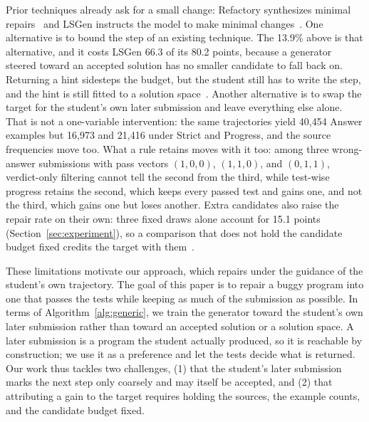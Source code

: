 \documentclass[10pt,conference]{IEEEtran}
\begin{document}
Prior techniques already ask for a small change: Refactory synthesizes minimal repairs~\cite{hu2019re} and LSGen instructs the model to make minimal changes~\cite{dai2026learner}. One alternative is to bound the step of an existing technique. The 13.9\% above is that alternative, and it costs LSGen 66.3 of its 80.2 points, because a generator steered toward an accepted solution has no smaller candidate to fall back on. Returning a hint sidesteps the budget, but the student still has to write the step, and the hint is still fitted to a solution space~\cite{rivers2017data,price2017isnap,roest2024next}. Another alternative is to swap the target for the student's own later submission and leave everything else alone. That is not a one-variable intervention: the same trajectories yield 40,454 Answer examples but 16,973 and 21,416 under Strict and Progress, and the source frequencies move too. What a rule retains moves with it too: among three wrong-answer submissions with pass vectors \((1,0,0)\), \((1,1,0)\), and \((0,1,1)\), verdict-only filtering cannot tell the second from the third, while test-wise progress retains the second, which keeps every passed test and gains one, and not the third, which gains one but loses another. Extra candidates also raise the repair rate on their own: three fixed draws alone account for 15.1 points (Section~\ref{sec:experiment}), so a comparison that does not hold the candidate budget fixed credits the target with them~\cite{zhang2024pydex,koutcheme2024benchmarking,yang2024cref,orvalho2025counterexample,dai2026learner}.

These limitations motivate our approach, which repairs under the guidance of the student's own trajectory. The goal of this paper is to repair a buggy program into one that passes the tests while keeping as much of the submission as possible. In terms of Algorithm~\ref{alg:generic}, we train the generator toward the student's own later submission rather than toward an accepted solution or a solution space. A later submission is a program the student actually produced, so it is reachable by construction; we use it as a preference and let the tests decide what is returned. Our work thus tackles two challenges, (1) that the student's later submission marks the next step only coarsely and may itself be accepted, and (2) that attributing a gain to the target requires holding the sources, the example counts, and the candidate budget fixed.
\end{document}
